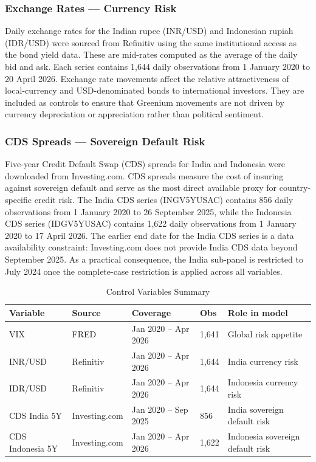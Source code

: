 \documentclass[12pt,a4paper]{article}
\begin{document}
\subsubsection{Exchange Rates --- Currency Risk}

Daily exchange rates for the Indian rupee (INR/USD) and Indonesian rupiah (IDR/USD) were sourced from Refinitiv using the same institutional access as the bond yield data. These are mid-rates computed as the average of the daily bid and ask. Each series contains 1,644 daily observations from 1 January 2020 to 20 April 2026. Exchange rate movements affect the relative attractiveness of local-currency and USD-denominated bonds to international investors. They are included as controls to ensure that Greenium movements are not driven by currency depreciation or appreciation rather than political sentiment.

\subsubsection{CDS Spreads --- Sovereign Default Risk}

Five-year Credit Default Swap (CDS) spreads for India and Indonesia were downloaded from Investing.com. CDS spreads measure the cost of insuring against sovereign default and serve as the most direct available proxy for country-specific credit risk. The India CDS series (INGV5YUSAC) contains 856 daily observations from 1 January 2020 to 26 September 2025, while the Indonesia CDS series (IDGV5YUSAC) contains 1,622 daily observations from 1 January 2020 to 17 April 2026. The earlier end date for the India CDS series is a data availability constraint: Investing.com does not provide India CDS data beyond September 2025. As a practical consequence, the India sub-panel is restricted to July 2024 once the complete-case restriction is applied across all variables.

\begin{table}[H]
\caption{Control Variables Summary}
\label{tab:controls}
\centering
\small
{}
\begin{tabular}{L{2.2cm} L{2.2cm} L{3.2cm} C{1.0cm} L{4.0cm}}
\toprule
{}
\textbf{Variable} & \textbf{Source} & \textbf{Coverage} & \textbf{Obs} & \textbf{Role in model} \\
\midrule
VIX              & FRED           & Jan 2020 -- Apr 2026 & 1,641 & Global risk appetite \\
INR/USD          & Refinitiv      & Jan 2020 -- Apr 2026 & 1,644 & India currency risk \\
IDR/USD          & Refinitiv      & Jan 2020 -- Apr 2026 & 1,644 & Indonesia currency risk \\
CDS India 5Y     & Investing.com  & Jan 2020 -- Sep 2025 &   856 & India sovereign default risk \\
CDS Indonesia 5Y & Investing.com  & Jan 2020 -- Apr 2026 & 1,622 & Indonesia sovereign default risk \\
\bottomrule
\end{tabular}
\end{table}
\end{document}
